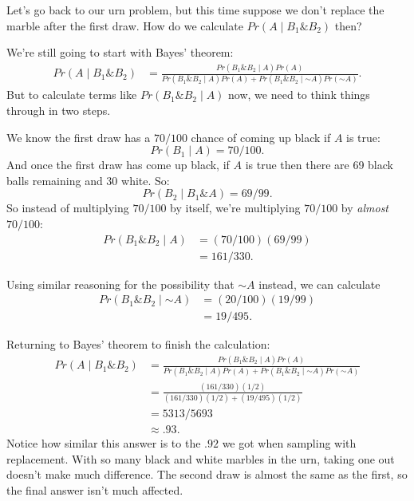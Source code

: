 \documentclass[justified]{tufte-book}
\newcommand{\given}{\mid}
\renewcommand{\neg}{\mathbin{\sim}}
\renewcommand{\wedge}{\mathbin{\&}}
\newcommand{\p}{Pr}
\theoremstyle{definition}
\theoremstyle{definition}
\theoremstyle{definition}
\theoremstyle{remark}
\begin{document}
Let's go back to our urn problem, but this time suppose we don't replace the marble after the first draw. How do we calculate \(\p(A \given B_1 \wedge B_2)\) then?

We're still going to start with Bayes' theorem:
\[
  \begin{aligned}
    \p(A \given B_1 \wedge B_2) &= \frac{\p(B_1 \wedge B_2 \given A)\p(A)}{\p(B_1 \wedge B_2 \given A) \p(A) + \p(B_1 \wedge B_2 \given \neg A) \p(\neg A)}.
  \end{aligned}
\]
But to calculate terms like \(\p(B_1 \wedge B_2 \given A)\) now, we need to think things through in two steps.

We know the first draw has a \(70/100\) chance of coming up black if \(A\) is true:
\[ \p(B_1 \given A) = 70/100. \]
And once the first draw has come up black, if \(A\) is true then there are 69 black balls remaining and 30 white. So:
\[ \p(B_2 \given B_1 \wedge A) = 69/99. \]
So instead of multiplying \(70/100\) by itself, we're multiplying \(70/100\) by \emph{almost} \(70/100\):
\[
  \begin{aligned}
    \p(B_1 \wedge B_2 \given A) &= (70/100)(69/99)\\
       &= 161/330.
  \end{aligned}
\]

Using similar reasoning for the possibility that \(\neg A\) instead, we can calculate
\[
  \begin{aligned}
    \p(B_1 \wedge B_2 \given \neg A) &= (20/100)(19/99)\\
       &= 19/495.
  \end{aligned}
\]

Returning to Bayes' theorem to finish the calculation:
\[
  \begin{aligned}
    \p(A \given B_1 \wedge B_2) &= \frac{\p(B_1 \wedge B_2 \given A)\p(A)}{\p(B_1 \wedge B_2 \given A) \p(A) + \p(B_1 \wedge B_2 \given \neg A) \p(\neg A)} \\
      &= \frac{(161/330)(1/2)}{(161/330)(1/2) + (19/495)(1/2)} \\
      &= 5313/5693 \\
      &\approx .93. 
  \end{aligned}
\]
Notice how similar this answer is to the \(.92\) we got when sampling with replacement. With so many black and white marbles in the urn, taking one out doesn't make much difference. The second draw is almost the same as the first, so the final answer isn't much affected.
\end{document}
